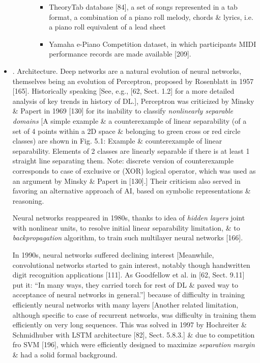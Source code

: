 \documentclass{article}
\begin{document}
\begin{itemize}
\begin{itemize}
\begin{itemize}
\begin{itemize}
				\item TheoryTab database [84], a set of songs represented in a tab format, a combination of a piano roll melody, chords \& lyrics, i.e. a piano roll equivalent of a lead sheet
				\item Yamaha e-Piano Competition dataset, in which participants MIDI performance records are made available [209].
			\end{itemize}
		\end{itemize}
	\end{itemize}
	\item {. Architecture.} Deep networks are a natural evolution of neural networks, themselves being an evolution of Perceptron, proposed by {\sc Rosenblatt} in 1957 [165]. Historically speaking [See, e.g., [62, Sect. 1.2] for a more detailed analysis of key trends in history of DL.], Perceptron was criticized by {\sc Minsky \& Papert} in 1969 [130] for its inability to classify {\it nonlinearly separable domains} [A simple example \& a counterexample of linear separability (of a set of 4 points within a 2D space \& belonging to green cross or red circle classes) are shown in {\sf Fig. 5.1: Example \& counterexample of linear separability.} Elements of 2 classes are linearly separable if there is at least 1 straight line separating them. Note: discrete version of counterexample corresponds to case of exclusive or (XOR) logical operator, which was used as an argument by {\sc Minsky \& Papert} in [130].] Their criticism also served in favoring an alternative approach of AI, based on symbolic representations \& reasoning.
	
	Neural networks reappeared in 1980s, thanks to idea of {\it hidden layers} joint with nonlinear units, to resolve initial linear separability limitation, \& to {\it backpropagation} algorithm, to train such multilayer neural networks [166].
	
	In 1990s, neural networks suffered declining interest [Meanwhile, convolutional networks started to gain interest, notably though handwritten digit recognition applications [111]. As Goodfellow et al. in [62, Sect. 9.11] put it: ``In many ways, they carried torch for rest of DL \& paved way to acceptance of neural networks in general.''] because of difficulty in training efficiently neural networks with many layers [Another related limitation, although specific to case of recurrent networks, was difficulty in training them efficiently on very long sequences. This was solved in 1997 by {\sc Hochreiter \& Schmidhuber} with LSTM architecture [82], Sect. 5.8.3.] \& due to competition fro SVM [196], which were efficiently designed to maximize {\it separation margin} \& had a solid formal background.
	

\end{itemize}
\end{document}
